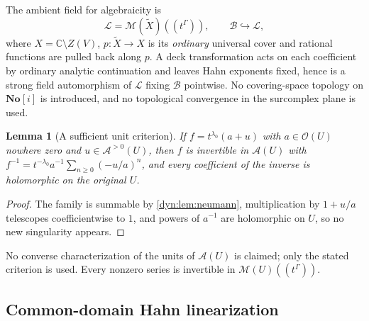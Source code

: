 \documentclass[11pt,letterpaper]{article}
\newtheorem{lemma}[lemma]{Lemma}
\theoremstyle{definition}
\theoremstyle{remark}
\newcommand{\C}{\mathbb C}
\newcommand{\No}{\mathbf{No}}
\newcommand{\OO}{\mathcal O}
\newcommand{\MM}{\mathcal M}
\newcommand{\AAA}{\mathscr A}
\newcommand{\BB}{\mathscr B}
\newcommand{\LL}{\mathscr L}
\numberwithin{equation}{section}
\begin{document}
The ambient field for algebraicity is
\begin{equation}\label{dyn:eq:ambientfield}
 \LL=\MM(\widetilde X)((t^{\Gamma})),\qquad
 \BB\hookrightarrow\LL,
\end{equation}
where $X=\C\setminus Z(V)$, $p:\widetilde X\to X$ is its \emph{ordinary}
universal cover and rational functions are pulled back along $p$. A deck
transformation acts on each coefficient by ordinary analytic continuation
and leaves Hahn exponents fixed, hence is a strong field automorphism of
$\LL$ fixing $\BB$ pointwise. No covering-space topology on $\No[i]$ is
introduced, and no topological convergence in the surcomplex plane is used.

\begin{lemma}[A sufficient unit criterion]\label{dyn:lem:unit}
If $f=t^{\lambda_0}(a+u)$ with $a\in\OO(U)$ nowhere zero and
$u\in\AAA^{>0}(U)$, then $f$ is invertible in $\AAA(U)$ with
$f^{-1}=t^{-\lambda_0}a^{-1}\sum_{n\ge0}(-u/a)^{n}$, and every coefficient
of the inverse is holomorphic on the \emph{original} $U$.
\end{lemma}
\begin{proof}
The family is summable by \cref{dyn:lem:neumann}, multiplication by
$1+u/a$ telescopes coefficientwise to $1$, and powers of $a^{-1}$ are
holomorphic on $U$, so no new singularity appears.
\end{proof}

No converse characterization of the units of $\AAA(U)$ is claimed; only the
stated criterion is used. Every nonzero series is invertible in
$\MM(U)((t^{\Gamma}))$.

\subsection{Common-domain Hahn linearization}
\end{document}
